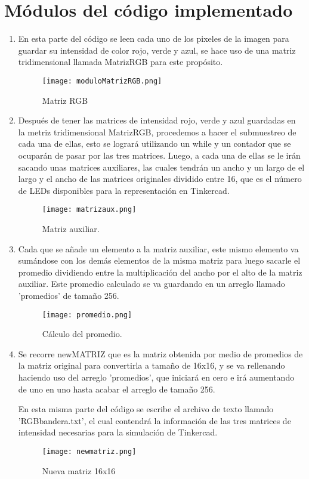 \documentclass{article}
\begin{document}
\section{Módulos del código implementado} \label{Modulos}
\begin{enumerate}
\item En esta parte del código se leen cada uno de los pixeles de la imagen para guardar su intensidad de color rojo, verde y azul, se hace uso de una matriz tridimensional llamada MatrizRGB para este propósito.

\begin{figure}[h]
\texttt{[image: moduloMatrizRGB.png]}
\centering
\caption{Matriz RGB}
\label{fig:matrizRGB}
\end{figure}

\item Después de tener las matrices de intensidad rojo, verde y azul guardadas en la metriz tridimensional MatrizRGB, procedemos a hacer el submuestreo de cada una de ellas, esto se logrará utilizando un while y un contador que se ocuparán de pasar por las tres matrices. Luego, a cada una de ellas se le irán sacando unas matrices auxiliares, las cuales tendrán un ancho y un largo de el largo y el ancho de las matrices originales dividido entre 16, que es el número de LEDs disponibles para la representación en Tinkercad.

\begin{figure}[h]
\texttt{[image: matrizaux.png]}
\centering
\caption{Matriz auxiliar.}
\label{fig:matrizaux}
\end{figure}

\item Cada que se añade un elemento a la matriz auxiliar, este mismo elemento va sumándose con los demás elementos de la misma matriz para luego sacarle el promedio dividiendo entre la multiplicación del ancho por el alto de la matriz auxiliar. Este promedio calculado se va guardando en un arreglo llamado 'promedios' de tamaño 256.

\begin{figure}[h]
\texttt{[image: promedio.png]}
\centering
\caption{Cálculo del promedio.}
\label{fig:promedio}
\end{figure}

\item Se recorre newMATRIZ que es la matriz obtenida por medio de promedios de la matriz original para convertirla a tamaño de 16x16, y se va rellenando haciendo uso del arreglo 'promedios', que iniciará en cero e irá aumentando de uno en uno hasta acabar el arreglo de tamaño 256.

En esta misma parte del código se escribe el archivo de texto llamado 'RGBbandera.txt', el cual contendrá la información de las tres matrices de intensidad necesarias para la simulación de Tinkercad.

\begin{figure}[h]
\texttt{[image: newmatriz.png]}
\centering
\caption{Nueva matriz 16x16}
\label{fig:nuevamatriz}
\end{figure}

\end{enumerate}
\end{document}
